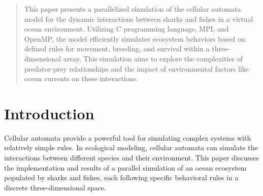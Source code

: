 \documentclass[conference,compsoc]{IEEEtran}
\begin{document}




\maketitle

\begin{abstract}
This paper presents a parallelized simulation of the cellular automata model for the dynamic interactions between sharks and fishes in a virtual ocean environment. Utilizing C programming language, MPI, and OpenMP, the model efficiently simulates ecosystem behaviors based on defined rules for movement, breeding, and survival within a three-dimensional array. This simulation aims to explore the complexities of predator-prey relationships and the impact of environmental factors like ocean currents on these interactions.

\end{abstract}





%
\IEEEpeerreviewmaketitle



\section{Introduction}
Cellular automata provide a powerful tool for simulating complex systems with relatively simple rules. In ecological modeling, cellular automata can simulate the interactions between different species and their environment. This paper discusses the implementation and results of a parallel simulation of an ocean ecosystem populated by sharks and fishes, each following specific behavioral rules in a discrete three-dimensional space.
\end{document}
